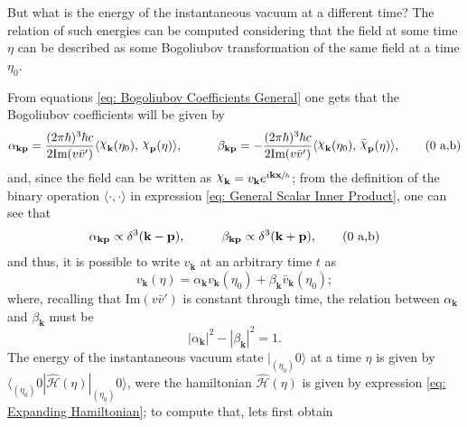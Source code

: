 \vspace*{0.5cm}

But what is the energy of the instantaneous vacuum at a different time? The relation of such energies can be computed considering that the field at some time $\eta$ can be described as some Bogoliubov transformation of the same field at a time $\eta_0$.

From equations \ref{eq: Bogoliubov Coefficients General} one gets that the Bogoliubov coefficients will be given by
\begin{subequations}
	\begin{gather}
		\alpha_{\mathbf{kp}}=\frac{(2\pi\hbar)^3\hbar c}{2\text{Im}(v\bar v')}\langle \rchi_\mathbf{k}(\eta_0),\,\rchi_\mathbf{p}(\eta)\rangle,\hspace{1.0cm}\beta_{\mathbf{kp}}=-\frac{(2\pi\hbar)^3\hbar c}{2\text{Im}(v\bar v')}\langle \rchi_\mathbf{k}(\eta_0),\,\bar \rchi_\mathbf{p}(\eta)\rangle,\tag{\theequation \,\,a,b}
	\end{gather}
\end{subequations}
and, since the field can be written as $\rchi_\mathbf{k}=v_\mathbf{k}e^{i\mathbf{kx}\sfrac{}{h}}$; from the definition of the binary operation $\langle\cdot,\cdot\rangle$ in expression \ref{eq: General Scalar Inner Product}, one can see that
\begin{subequations}
	\begin{gather}
		\alpha_{\mathbf{kp}}\propto \delta^3(\mathbf{k}-\mathbf{p}),\hspace{1.0cm}\beta_{\mathbf{kp}}\propto \delta^3(\mathbf{k}+\mathbf{p}),\tag{\theequation \,\,a,b}
	\end{gather}
\end{subequations}
and thus, it is possible to write $v_\mathbf{k}$ at an arbitrary time $t$ as
\begin{equation}
	v_\mathbf{k}(\eta)=\alpha_\mathbf{k}v_\mathbf{k}(\eta_0)+\beta_\mathbf{k}\bar v_\mathbf{k}(\eta_0);
\end{equation}
where, recalling that $\text{Im}(v\bar v')$ is constant through time, the relation between $\alpha_\mathbf{k}$ and $\beta_\mathbf{k}$ must be
\begin{equation}
	|\alpha_\mathbf{k}|^2-|\beta_\mathbf{k}|^2=1.
\end{equation}
The energy of the instantaneous vacuum state $|_{(\eta_0)}0\rangle$ at a time $\eta$ is given by $\langle_{(\eta_0)}0|\hat{\mathcal{H}}(\eta)|_{(\eta_0)}0\rangle$, were the hamiltonian $\hat{\mathcal{H}}(\eta)$ is given by expression \ref{eq: Expanding Hamiltonian}; to compute that, lets first obtain


